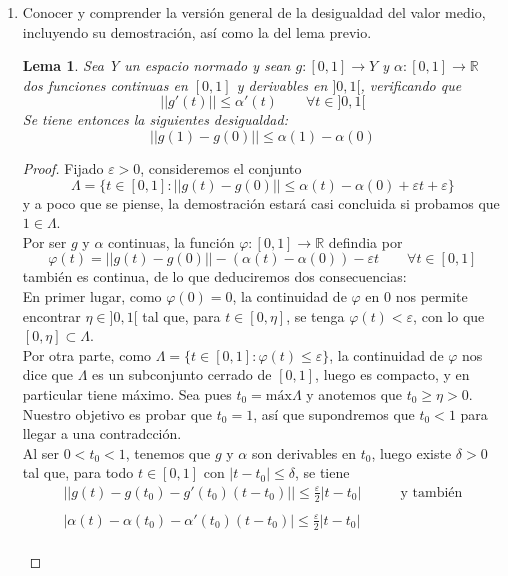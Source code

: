 \documentclass[a4paper, 12pt]{article}
\newtheorem*{lema*}{Lema}
\begin{document}
\begin{enumerate}[label=\textbf{\arabic*}.]
\bigskip

\item Conocer y comprender la versión general de la desigualdad del valor medio, incluyendo su demostración, así como la del lema previo.

\begin{lema*}
Sea Y un espacio normado y sean \(g: [0,1] \to Y\) y \(\alpha: [0,1] \to \mathbb{R}\) dos funciones continuas en \([0,1]\) y derivables en \(]0,1[\), verificando que 
\begin{equation} \label{lema_1}
	||g'(t)|| \leq \alpha' (t) \qquad \forall t \in ]0,1[
\end{equation}
Se tiene entonces la siguientes desigualdad:
\begin{equation}\label{lema_2}
|| g(1) - g(0)|| \leq \alpha (1) - \alpha (0)
\end{equation}
\end{lema*}

\begin{proof}
Fijado \(\varepsilon > 0\), consideremos el conjunto 
\[
	\Lambda = \{ t \in [0,1] : ||g(t) - g(0)|| \leq \alpha (t) - \alpha(0) + \varepsilon t + \varepsilon \}
\]
y a poco que se piense, la demostración estará casi concluida si probamos que \(1 \in \Lambda\). \\

Por ser \(g\) y \(\alpha\) continuas, la función \(\varphi : [0,1] \to \mathbb{R}\) defindia por
\[
	\varphi (t) = ||g(t) - g(0) || - ( \alpha (t) - \alpha (0)) - \varepsilon t \qquad \forall t \in [0,1]
\]
también es continua, de lo que deduciremos dos consecuencias:\\

En primer lugar, como \(\varphi (0) = 0\), la continuidad de \(\varphi\) en 0 nos permite encontrar \(\eta \in ]0,1[\) tal que, para \(t \in [0, \eta]\), se tenga \(\varphi (t) < \varepsilon\), con lo que \([0,\eta] \subset \Lambda\). \\

Por otra parte, como \(\Lambda = \{ t \in [0,1] : \varphi (t) \leq \varepsilon\}\), la continuidad de \(\varphi\) nos dice que \(\Lambda\) es un subconjunto cerrado de \([0,1]\), luego es compacto, y en particular tiene máximo. Sea pues \(t_0 = \text{máx} \Lambda\) y anotemos que \(t_0 \geq \eta > 0\). Nuestro objetivo es probar que \(t_0 = 1\), así que supondremos que \(t_0 < 1\) para llegar a una contradcción. \\

Al ser \(0 < t_0 < 1\), tenemos que \(g\) y \(\alpha\) son derivables en \(t_0\), luego existe \(\delta >0\) tal que, para todo \(t \in [0,1]\) con \(|t-t_0| \leq \delta\), se tiene
\[
\begin{array}{cc}
||g(t) - g(t_0) - g'(t_0) (t-t_0) || \leq \frac{\varepsilon}{2} |t - t_0| & \qquad \text{y también} \\
\\
| \alpha(t) - \alpha (t_0) - \alpha'(t_0) (t-t_0)| \leq \frac{\varepsilon}{2} |t - t_0|
\end{array}
\] \\


\end{proof}
\end{enumerate}
\end{document}
